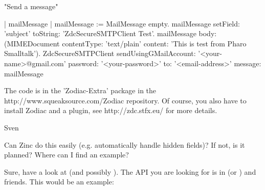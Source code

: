 \documentclass[a4paper,10pt,twoside]{book}
\begin{document}
"Send a message"
\begin{code}{}
| mailMessage |
mailMessage := MailMessage empty.
mailMessage setField: 'subject' toString: 'ZdcSecureSMTPClient Test'.
mailMessage body: (MIMEDocument contentType: 'text/plain' content: 'This is test from Pharo Smalltalk').
ZdcSecureSMTPClient
	sendUsingGMailAccount: '<your-name>@gmail.com' 
	password: '<your-password>'
	to: '<email-address>' 
	message: mailMessage
\end{code}
The code is in the 'Zodiac-Extra' package in the http://www.squeaksource.com/Zodiac repository.
Of course, you also have to install Zodiac and a plugin, see http://zdc.stfx.eu/ for more details.

Sven


%
%

Can Zinc do this easily (e.g. automatically handle hidden fields)? If not, is
it planned? Where can I find an example?

Sure, have a look at  (and possibly ).
The API you are looking for is in  (or ) and friends.
This would be an example:
\end{document}
